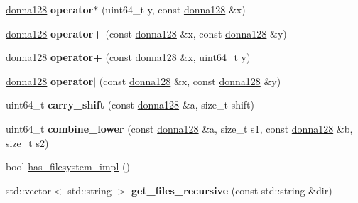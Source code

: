 \begin{DoxyCompactItemize}
\item 
\mbox{\label{namespace_botan_a3a244929b2ae17b43206587dcfc536be}} 
\mbox{\hyperlink{class_botan_1_1donna128}{donna128}} {\bfseries operator$\ast$} (uint64\+\_\+t y, const \mbox{\hyperlink{class_botan_1_1donna128}{donna128}} \&x)
\item 
\mbox{\label{namespace_botan_a04d9042165591b302e15c61f7ad081e1}} 
\mbox{\hyperlink{class_botan_1_1donna128}{donna128}} {\bfseries operator+} (const \mbox{\hyperlink{class_botan_1_1donna128}{donna128}} \&x, const \mbox{\hyperlink{class_botan_1_1donna128}{donna128}} \&y)
\item 
\mbox{\label{namespace_botan_ae7976bfaf3d3a65ba010b94237cc9b31}} 
\mbox{\hyperlink{class_botan_1_1donna128}{donna128}} {\bfseries operator+} (const \mbox{\hyperlink{class_botan_1_1donna128}{donna128}} \&x, uint64\+\_\+t y)
\item 
\mbox{\label{namespace_botan_aa6bb91149ce059bbaf2733e1590111d7}} 
\mbox{\hyperlink{class_botan_1_1donna128}{donna128}} {\bfseries operator$\vert$} (const \mbox{\hyperlink{class_botan_1_1donna128}{donna128}} \&x, const \mbox{\hyperlink{class_botan_1_1donna128}{donna128}} \&y)
\item 
\mbox{\label{namespace_botan_a78f03d5ad2b788e9165b76192951cfaf}} 
uint64\+\_\+t {\bfseries carry\+\_\+shift} (const \mbox{\hyperlink{class_botan_1_1donna128}{donna128}} \&a, size\+\_\+t shift)
\item 
\mbox{\label{namespace_botan_a8a55717f300b4c1ba4c45f4eb5813c86}} 
uint64\+\_\+t {\bfseries combine\+\_\+lower} (const \mbox{\hyperlink{class_botan_1_1donna128}{donna128}} \&a, size\+\_\+t s1, const \mbox{\hyperlink{class_botan_1_1donna128}{donna128}} \&b, size\+\_\+t s2)
\item 
bool \mbox{\hyperlink{namespace_botan_acc6c58c9b9ef1e9aa417eb2e71371828}{has\+\_\+filesystem\+\_\+impl}} ()
\item 
\mbox{\label{namespace_botan_a2c7857bf68bffe64c3810d4000fa920d}} 
std\+::vector$<$ std\+::string $>$ {\bfseries get\+\_\+files\+\_\+recursive} (const std\+::string \&dir)
\item 

\end{DoxyCompactItemize}
